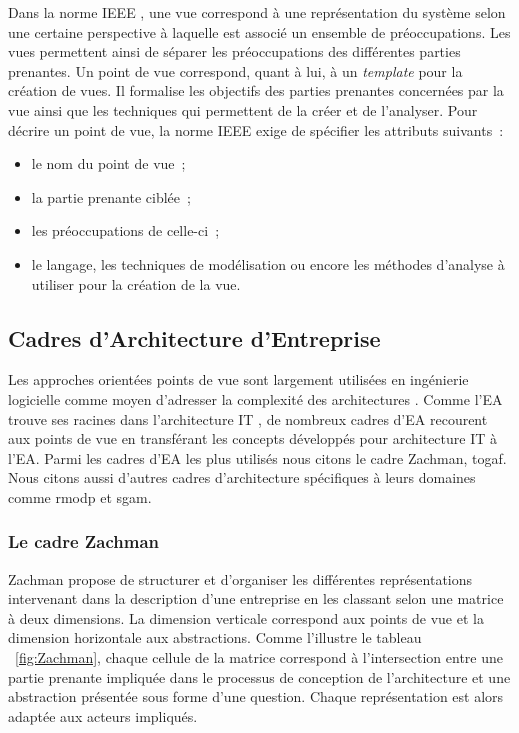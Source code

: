 Dans la norme IEEE \cite{hilliard2000ieee}, une vue correspond à une
représentation du système selon une certaine perspective à laquelle est
associé un ensemble de préoccupations. Les vues permettent ainsi de séparer
les préoccupations des différentes parties prenantes. Un point de vue
correspond, quant à lui, à un \textit{template} pour la création de vues. Il formalise
les objectifs des parties prenantes concernées par la vue ainsi que les
techniques qui permettent de la créer et de l'analyser. Pour décrire un point
de vue, la norme IEEE \cite{hilliard2000ieee} exige de spécifier les
attributs suivants~:
\begin{itemize} 
	\item le nom du point de vue~;
	\item la partie prenante ciblée~;
	\item les préoccupations de celle-ci~;
	\item le langage, les techniques de modélisation ou encore les méthodes d'analyse à utiliser pour
la création de la vue. 
\end{itemize}

\subsection{Cadres d'Architecture d'Entreprise}

Les approches orientées points de vue sont largement utilisées en ingénierie
logicielle comme moyen d'adresser la complexité des architectures
\cite{steen2004supporting}. Comme l'EA trouve ses racines dans l'architecture
IT \cite{winter2008enterprise}, de nombreux cadres d'EA recourent aux points de
vue en transférant les concepts développés pour architecture IT à l'EA. Parmi
les cadres d'EA les plus utilisés nous citons le cadre Zachman, \gls{togaf}. Nous citons aussi d'autres cadres d'architecture spécifiques à leurs domaines comme \gls{rmodp} et \gls{sgam}. 

\subsubsection{Le cadre Zachman}

Zachman \cite{zachman1987framework} propose de structurer et d'organiser les
différentes représentations intervenant dans la description d'une entreprise en
les classant selon une matrice à deux dimensions. La dimension verticale
correspond aux points de vue et la dimension horizontale aux abstractions.
Comme l'illustre le tableau ~\ref{fig:Zachman}, chaque cellule de la matrice
correspond à l'intersection entre une partie prenante impliquée dans le
processus de conception de l'architecture et une abstraction présentée sous
forme d'une question. Chaque représentation est alors adaptée aux acteurs
impliqués. 

